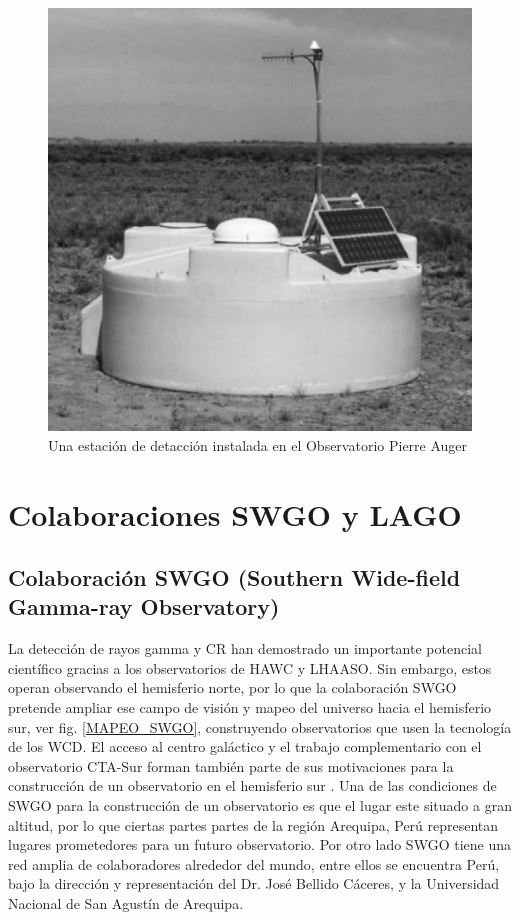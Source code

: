 	\begin{figure}[h]
		\centering
		\includegraphics[scale=0.6]{FIGURAS/TANQUE_PIERRE_AUGER.PNG}
		\caption{Una estación de detacción instalada en el Observatorio Pierre Auger}
		\label{TANQUE_PIERRE_AUGER}
	\end{figure}

\section{Colaboraciones SWGO y LAGO}
	\subsection{Colaboración SWGO (Southern Wide-field Gamma-ray Observatory)}\label{SWGO}
	La detección de rayos gamma y CR han demostrado un importante potencial científico gracias a los observatorios de HAWC y LHAASO. Sin embargo, estos operan observando el hemisferio norte, por lo que la colaboración SWGO pretende ampliar ese campo de visión y mapeo del universo hacia el hemisferio sur, ver fig. \ref{MAPEO_SWGO}, construyendo observatorios que usen la tecnología de los WCD. El acceso al centro galáctico y el trabajo complementario con el observatorio CTA-Sur forman también parte de sus motivaciones para la construcción de un observatorio en el hemisferio sur \cite{schoorlemmer2019nextgeneration}. Una de las condiciones de SWGO para la construcción de un observatorio es que el lugar este situado a gran altitud, por lo que ciertas partes partes de la región Arequipa, Perú representan lugares prometedores para un futuro observatorio. Por otro lado SWGO tiene una red amplia de colaboradores alrededor del mundo, entre ellos se encuentra Perú, bajo la dirección y representación del Dr. José Bellido Cáceres, y la Universidad Nacional de San Agustín de Arequipa.
	
